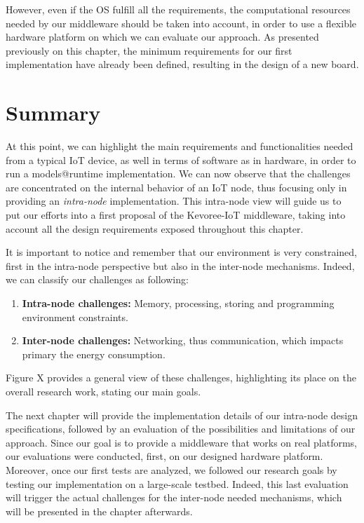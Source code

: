 However, even if the OS fulfill all the requirements, the computational resources needed by our middleware should be taken into account, in order to use a flexible hardware platform on which we can evaluate our approach.
As presented previously on this chapter, the minimum requirements for our first implementation have already been defined, resulting in the design of a new board.

\section{Summary}
At this point, we can highlight the main requirements and functionalities needed from a typical IoT device, as well in terms of software as in hardware, in order to run a models@runtime implementation.
We can now observe that the challenges are concentrated on the internal behavior of an IoT node, thus focusing only in providing an \textit{intra-node} implementation.
This intra-node view will guide us to put our efforts into a first proposal of the Kevoree-IoT middleware, taking into account all the design requirements exposed throughout this chapter.

It is important to notice and remember that our environment is very constrained, first in the intra-node perspective but also in the inter-node mechanisms.
Indeed, we can classify our challenges as following:

\begin{enumerate}
	\item \textbf{Intra-node challenges:} Memory, processing, storing and programming environment constraints.
	\item \textbf{Inter-node challenges:} Networking, thus communication, which impacts primary the energy consumption.
\end{enumerate}

Figure X provides a general view of these challenges, highlighting its place on the overall research work, stating our main goals.

The next chapter will provide the implementation details of our intra-node design specifications, followed by an evaluation of the possibilities and limitations of our approach.
Since our goal is to provide a middleware that works on real platforms, our evaluations were conducted, first, on our designed hardware platform.
Moreover, once our first tests are analyzed, we followed our research goals by testing our implementation on a large-scale testbed.
Indeed, this last evaluation will trigger the actual challenges for the inter-node needed mechanisms, which will be presented in the chapter afterwards.


